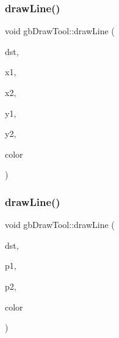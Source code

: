 \mbox{\label{classgb_draw_tool_a8826be594e9b5b80e03f75dd69f07eb8}} 
\subsubsection{\texorpdfstring{drawLine()}{drawLine()}\hspace{0.1cm}{\footnotesize\ttfamily [1/2]}}
{\footnotesize\ttfamily void gb\+Draw\+Tool\+::draw\+Line (\begin{DoxyParamCaption}\item[{S\+D\+L\+\_\+\+Texture $\ast$}]{dst,  }\item[{int}]{x1,  }\item[{int}]{x2,  }\item[{int}]{y1,  }\item[{int}]{y2,  }\item[{\mbox{\hyperlink{classgb_color}{gb\+Color}}}]{color }\end{DoxyParamCaption})}

\mbox{\label{classgb_draw_tool_a70eb8954ce054fca2c7aab73beafa211}} 
\subsubsection{\texorpdfstring{drawLine()}{drawLine()}\hspace{0.1cm}{\footnotesize\ttfamily [2/2]}}
{\footnotesize\ttfamily void gb\+Draw\+Tool\+::draw\+Line (\begin{DoxyParamCaption}\item[{S\+D\+L\+\_\+\+Texture $\ast$}]{dst,  }\item[{\mbox{\hyperlink{classgb_point}{gb\+Point}}}]{p1,  }\item[{\mbox{\hyperlink{classgb_point}{gb\+Point}}}]{p2,  }\item[{\mbox{\hyperlink{classgb_color}{gb\+Color}}}]{color }\end{DoxyParamCaption})}

\mbox{\label{classgb_draw_tool_a50324f2006b5afc55255fc2c345160c8}} 
